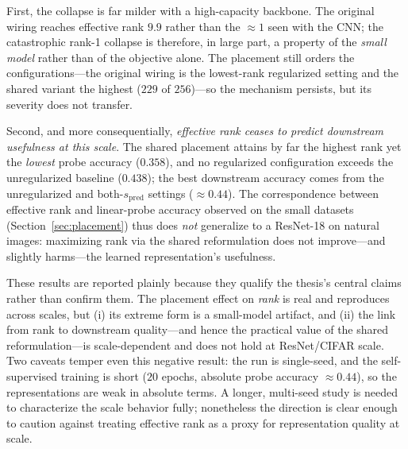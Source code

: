 First, the collapse is far milder with a high-capacity backbone. The original
wiring reaches effective rank $9.9$ rather than the $\approx 1$ seen with the
CNN; the catastrophic rank-1 collapse is therefore, in large part, a property
of the \emph{small model} rather than of the objective alone. The placement
still orders the configurations---the original wiring is the lowest-rank
regularized setting and the shared variant the highest ($229$ of $256$)---so
the mechanism persists, but its severity does not transfer.

Second, and more consequentially, \emph{effective rank ceases to predict
downstream usefulness at this scale}. The shared placement attains by far the
highest rank yet the \emph{lowest} probe accuracy ($0.358$), and no regularized
configuration exceeds the unregularized baseline ($0.438$); the best downstream
accuracy comes from the unregularized and both-$s_{\text{pred}}$ settings
($\approx 0.44$). The correspondence between effective rank and linear-probe
accuracy observed on the small datasets (Section~\ref{sec:placement}) thus does
\emph{not} generalize to a ResNet-18 on natural images: maximizing rank via the
shared reformulation does not improve---and slightly harms---the learned
representation's usefulness.

These results are reported plainly because they qualify the thesis's central
claims rather than confirm them. The placement effect on \emph{rank} is real
and reproduces across scales, but (i) its extreme form is a small-model
artifact, and (ii) the link from rank to downstream quality---and hence the
practical value of the shared reformulation---is scale-dependent and does not
hold at ResNet/CIFAR scale. Two caveats temper even this negative result: the
run is single-seed, and the self-supervised training is short ($20$ epochs,
absolute probe accuracy $\approx 0.44$), so the representations are weak in
absolute terms. A longer, multi-seed study is needed to characterize the scale
behavior fully; nonetheless the direction is clear enough to caution against
treating effective rank as a proxy for representation quality at scale.


